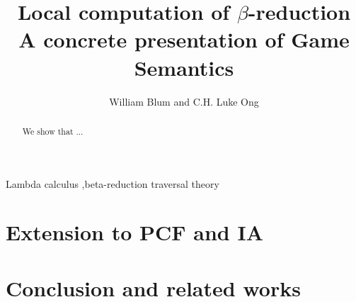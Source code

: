 \documentclass[preprint,12pt]{elsarticle}
\begin{document}
\begin{keyword}
Lambda calculus \sep beta-reduction
traversal theory
\end{keyword}
\begin{frontmatter}
\title{Local computation of $\beta$-reduction\\A concrete presentation of Game Semantics}
\author{William Blum and C.H. Luke Ong}
\address{Oxford University Computing Laboratory}
\begin{abstract}
We show that ...
\end{abstract}
\end{frontmatter}

\tableofcontents \bigskip

\listoftodos
\bigskip

    

    \section{Extension to PCF and IA}
    

    \section{Conclusion and related works}
    




\end{document}

